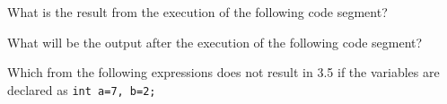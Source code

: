\documentclass[11pt]{examdesign}
\begin{document}
\begin{multiplechoice}[title={},suppressprefix=yes,rearrange=no]
\begin{question}
What is the result from the execution of the following code segment?
\end{question}

\begin{question}
What will be the output after the execution of the following code segment?
  \end{question}

\begin{question}
Which from the following expressions does not result in 3.5 if the variables are declared as \texttt{int a=7, b=2;}
\end{question}

\end{multiplechoice}
\end{document}
